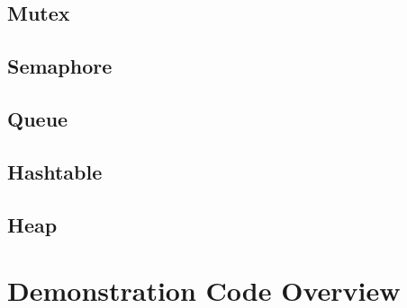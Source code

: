 \documentclass[12pt,a4paper]{article}
\begin{document}
\subsection{Mutex}
\subsection{Semaphore}
\subsection{Queue}
\subsection{Hashtable}
\subsection{Heap}

\section{Demonstration Code Overview}


\end{document}
